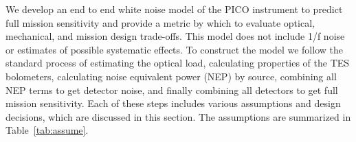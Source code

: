 \documentclass[]{spie}  %
\begin{document}
We develop an end to end white noise model of the PICO instrument to predict full mission sensitivity and 
provide a metric by which to evaluate optical, mechanical, and mission design trade-offs.  This model does not include 
1/f noise or estimates of possible systematic effects.  %
To construct the model we follow the standard process\cite{suzuki2013_thesis,aubin2013_thesis} of estimating the 
optical load, calculating properties of the TES bolometers, calculating noise equivalent power (NEP) by source, 
combining all NEP terms to get detector noise, and finally combining all detectors to get full mission sensitivity.  
Each of these steps includes various assumptions and design decisions, 
which are discussed in this section.  The assumptions are summarized in Table~\ref{tab:assume}.
\end{document}
